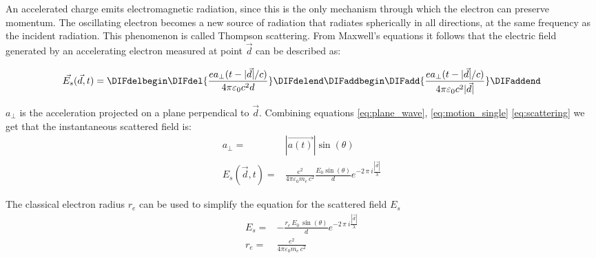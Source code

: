 An accelerated charge emits electromagnetic radiation, since this is
the only mechanism through which the electron can preserve
momentum. The oscillating electron becomes a new source of radiation
that radiates spherically in all directions, at the same frequency as
the incident radiation. This phenomenon is called Thompson
scattering. From Maxwell's equations it follows that the electric
field generated by an accelerating electron measured at point
$\vec{d}$ can be described as:

\begin{equation}\label{eq:scattering}
\vec{E_s}(\vec{d},t) = \DIFdelbegin \DIFdel{\frac{e a_\perp(t-|\vec{d}|/c)}{4 \pi \varepsilon_0c^2d}
}\DIFdelend \DIFaddbegin \DIFadd{\frac{e a_\perp(t-|\vec{d}|/c)}{4 \pi \varepsilon_0c^2|\vec{d}|}
}\DIFaddend \end{equation}

$a_{\perp}$ is the acceleration projected on a plane perpendical to
$\vec{d}$. Combining equations \ref{eq:plane_wave},
\ref{eq:motion_single} \DIFdelbegin \DIFdel{, }\DIFdelend \DIFaddbegin {}\DIFaddend \ref{eq:scattering} we get that the
instantaneous scattered field is:
\begin{align*}
a_\perp =& |\vec{a(t)}|\sin(\theta)\\
E_s(\vec{d},t) =& \frac{{e}^2}{4 \pi \varepsilon_0 m_e\,c^2} \frac{E_0 \sin(\theta)}{d} e^{-2\,\pi\ i \frac{|\vec{d}|}{\lambda}}
\end{align*}

The classical electron radius $r_e$ can be used to simplify the
equation for the scattered field $E_s$
\begin{align*}
E_s=& - \frac{r_e\,E_0\,\sin(\theta)}{d} e^{-2\,\pi\ i \frac{|\vec{d}|}{\lambda}}\\
r_e =& \frac{e^2}{4 \pi \varepsilon_0 m_e\,c^2}    
\end{align*}


\subsection{\DIFdelbegin {}\DIFdelend \DIFaddbegin {}\DIFaddend }

